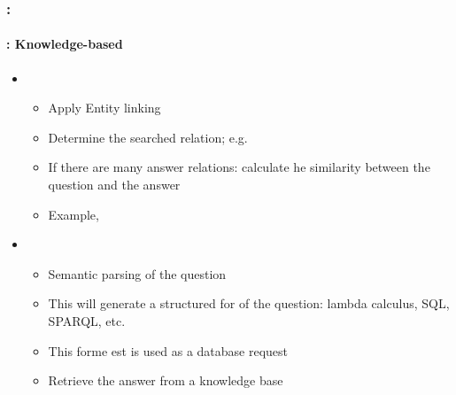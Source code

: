\documentclass[xcolor=table]{beamer}
\begin{document}
\begin{frame}
	\frametitle{\insertshortsubtitle: \insertsection}
	\framesubtitle{\insertsubsection: Knowledge-based}
	
	\begin{itemize}
		\item {}
		\begin{itemize}
			\item Apply Entity linking
			\item Determine the searched relation; e.g. 
			\item If there are many answer relations: calculate he similarity between the question and the answer
			\item Example, 
		\end{itemize}
		\item {}
		\begin{itemize}
			\item Semantic parsing of the question
			\item This will generate a structured for of the question: lambda calculus, SQL, SPARQL, etc.
			\item This forme est is used as a database request
			\item Retrieve the answer from a knowledge base
		\end{itemize}
	\end{itemize}
	
\end{frame}
\end{document}
